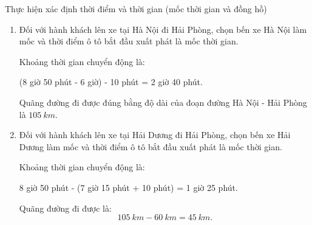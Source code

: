 \begin{dang}{Thực hiện xác định thời điểm và thời gian (mốc thời gian và đồng hồ)}
{		\begin{enumerate}[label=\alph*)]
			\item Đối với hành khách lên xe tại Hà Nội đi Hải Phòng, chọn bến xe Hà Nội làm mốc và thời điểm ô tô bắt đầu xuất phát là mốc thời gian.
			
			Khoảng thời gian chuyển động là:	
			\begin{center}
				(8 giờ 50 phút - 6 giờ) - 10 phút = 2 giờ 40 phút.
			\end{center}
			Quãng đường đi được đúng bằng độ dài của đoạn đường Hà Nội - Hải Phòng là $\SI{105}{km}$.
			\item Đối với hành khách lên xe tại Hải Dương đi Hải Phòng, chọn bến xe Hải Dương làm mốc và thời điểm ô tô bắt đầu xuất phát là mốc thời gian.
			
			Khoảng thời gian chuyển động là:
			\begin{center}
				8 giờ 50 phút - (7 giờ 15 phút + 10 phút) = 1 giờ 25 phút.
			\end{center}
			Quãng đường đi được là:
			$$\SI{105}{km}-\SI{60}{km}=\SI{45}{km}.$$
		\end{enumerate}
	}
\end{dang}
